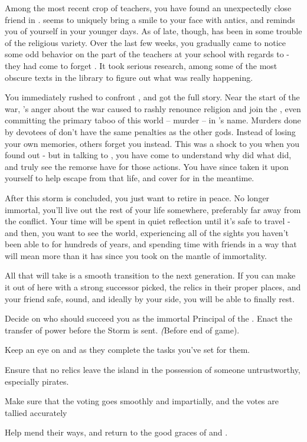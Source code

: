 \documentclass[char]{GL2020}
\begin{document}
Among the most recent crop of teachers, you have found an unexpectedly close friend in \cChupAvenger{}. \cChupAvenger{} seems to uniquely bring a smile to your face with \cChupAvenger{\their} antics, and reminds you of yourself in your younger days. As of late, though, \cChupAvenger{} has been in some trouble of the religious variety. Over the last few weeks, you gradually came to notice some odd behavior on the part of the teachers at your school with regards to \cChupAvenger{} - they had come to forget \cChupAvenger{\them}. It took serious research, among some of the most obscure texts in the library to figure out what was really happening. 

You immediately rushed to confront \cChupAvenger{}, and got the full story. Near the start of the war, \cChupAvenger{}’s anger about the war caused \cChupAvenger{\them} to rashly renounce \cChupAvenger{\their} religion and join the \pGoaties{}, even committing the primary taboo of this world -- murder -- in \cGenesis{}’s name. Murders done by devotees of \cGenesis{} don’t have the same penalties as the other gods. Instead of losing your own memories, others forget you instead. This was a shock to you when you found out - but in talking to \cChupAvenger{}, you have come to understand why \cChupAvenger{\they} did what \cChupAvenger{\they} did, and truly see the remorse \cChupAvenger{\they} have for those actions. You have since taken it upon yourself to help \cChupAvenger{} escape from that life, and cover for \cChupAvenger{\them} in the meantime.

After this storm is concluded, you just want to retire in peace. No longer immortal, you’ll live out the rest of your life somewhere, preferably far away from the conflict. Your time will be spent in quiet reflection until it’s safe to travel - and then, you want to see the world, experiencing all of the sights you haven’t been able to for hundreds of years, and spending time with friends in a way that will mean more than it has since you took on the mantle of immortality.

All that will take is a smooth transition to the next generation. If you can make it out of here with a strong successor picked, the relics in their proper places, and your friend \cChupAvenger{} safe, sound, and ideally by your side, you will be able to finally rest.

\begin{itemz}[Goals]
	\item Decide on who should succeed you as the immortal Principal of the \pSchool{}. Enact the transfer of power before the Storm is sent. \emph(Before end of game).
	\item Keep an eye on \cMusic{} and \cBeetle{} as they complete the tasks you’ve set for them.
	\item Ensure that no relics leave the island in the possession of someone untrustworthy, especially pirates.
	\item Make sure that the voting goes smoothly and impartially, and the votes are tallied accurately
	\item Help \cChupAvenger{} mend their ways, and return to the good graces of \cEbb{} and \cFlow{}.
\end{itemz}
\end{document}
